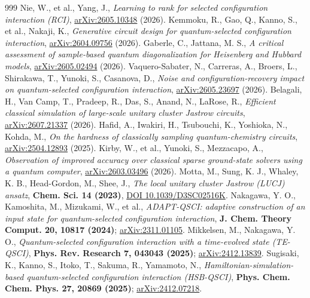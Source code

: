\documentclass[11pt]{article}
\begin{document}
\begin{thebibliography}{999}
 Nie, W., et al., Yang, J., \emph{Learning to rank for selected configuration interaction (RCI)}, \href{https://arxiv.org/abs/2605.10348}{arXiv:2605.10348} (2026).
 Kemmoku, R., Gao, Q., Kanno, S., et al., Nakaji, K., \emph{Generative circuit design for quantum-selected configuration interaction}, \href{https://arxiv.org/abs/2604.09756}{arXiv:2604.09756} (2026).
 Gaberle, C., Jattana, M. S., \emph{A critical assessment of sample-based quantum diagonalization for Heisenberg and Hubbard models}, \href{https://arxiv.org/abs/2605.02494}{arXiv:2605.02494} (2026).
 Vaquero-Sabater, N., Carreras, A., Broers, L., Shirakawa, T., Yunoki, S., Casanova, D., \emph{Noise and configuration-recovery impact on quantum-selected configuration interaction}, \href{https://arxiv.org/abs/2605.23697}{arXiv:2605.23697} (2026).
 Belagali, H., Van Camp, T., Pradeep, R., Das, S., Anand, N., LaRose, R., \emph{Efficient classical simulation of large-scale unitary cluster Jastrow circuits}, \href{https://arxiv.org/abs/2607.21337}{arXiv:2607.21337} (2026).
 Hafid, A., Iwakiri, H., Tsubouchi, K., Yoshioka, N., Kohda, M., \emph{On the hardness of classically sampling quantum-chemistry circuits}, \href{https://arxiv.org/abs/2504.12893}{arXiv:2504.12893} (2025).
 Kirby, W., et al., Yunoki, S., Mezzacapo, A., \emph{Observation of improved accuracy over classical sparse ground-state solvers using a quantum computer}, \href{https://arxiv.org/abs/2603.03496}{arXiv:2603.03496} (2026).
 Motta, M., Sung, K. J., Whaley, K. B., Head-Gordon, M., Shee, J., \emph{The local unitary cluster Jastrow (LUCJ) ansatz}, \textbf{Chem. Sci. 14 (2023)}, \href{https://doi.org/10.1039/D3SC02516K}{DOI 10.1039/D3SC02516K}.
 Nakagawa, Y. O., Kamoshita, M., Mizukami, W., et al., \emph{ADAPT-QSCI: adaptive construction of an input state for quantum-selected configuration interaction}, \textbf{J. Chem. Theory Comput. 20, 10817 (2024)}; \href{https://arxiv.org/abs/2311.01105}{arXiv:2311.01105}.
 Mikkelsen, M., Nakagawa, Y. O., \emph{Quantum-selected configuration interaction with a time-evolved state (TE-QSCI)}, \textbf{Phys. Rev. Research 7, 043043 (2025)}; \href{https://arxiv.org/abs/2412.13839}{arXiv:2412.13839}.
 Sugisaki, K., Kanno, S., Itoko, T., Sakuma, R., Yamamoto, N., \emph{Hamiltonian-simulation-based quantum-selected configuration interaction (HSB-QSCI)}, \textbf{Phys. Chem. Chem. Phys. 27, 20869 (2025)}; \href{https://arxiv.org/abs/2412.07218}{arXiv:2412.07218}.

\end{thebibliography}
\end{document}
